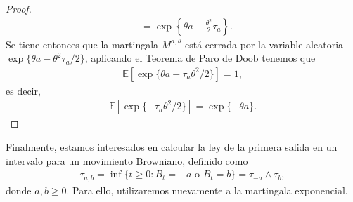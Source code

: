 \begin{proof}
\begin{align*}
& = \exp \left\{ \theta a - \frac{\theta^2}{2} \tau_a \right\}.
\end{align*}
Se tiene entonces que la martingala $M^{a, \theta}$ está cerrada por la variable aleatoria $ \exp \{ \theta a - \theta^2 \tau_a / 2 \}$, aplicando el Teorema de Paro de Doob tenemos que
\begin{align*}
\mathbb{E} \left[ \exp \{ \theta a - \tau_a \theta^2 / 2 \} \right] = 1, 
\end{align*}
es decir, 
\begin{align*}
\mathbb{E} \left[ \exp \{ - \tau_a \theta^2 / 2 \} \right] = \exp \{- \theta a \}.
\end{align*}
\end{proof}

Finalmente, estamos interesados en calcular la ley de la primera salida en un intervalo para un movimiento Browniano, definido como
\begin{align*}
\tau_{a, b} = \inf \{ t \geq 0 : B_t = -a \text{ o } B_t = b \} = \tau_{-a} \wedge \tau_{b},
\end{align*}
donde  $a, b \geq 0$. Para ello, utilizaremos nuevamente a la martingala exponencial.


